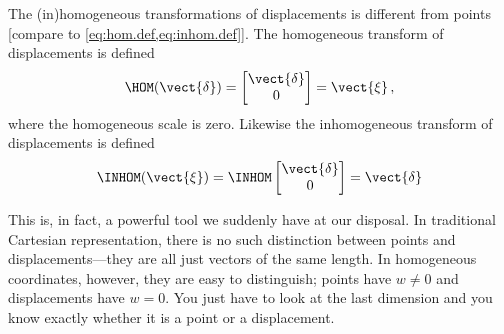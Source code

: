 \documentclass[oneandhalfcolumn]{coursenotes-handout}
\begin{document}
The (in)homogeneous transformations of displacements is different from points [compare to \cref{eq:hom.def,eq:inhom.def}]. The homogeneous transform of displacements is defined
\begin{align}
    \HOM(\vect{\delta}) = \begin{bmatrix} \vect{\delta} \\ 0 \end{bmatrix} = \vect{\xi} \,,
\end{align}
where the homogeneous scale is zero. Likewise the inhomogeneous transform of displacements is defined
\begin{align}
    \INHOM (\vect{\xi}) = \INHOM \begin{bmatrix} \vect{\delta} \\ 0 \end{bmatrix} = \vect{\delta}
\end{align}

This is, in fact, a powerful tool we suddenly have at our disposal. In traditional Cartesian representation, there is no such distinction between points and displacements---they are all just vectors of the same length. In homogeneous coordinates, however, they are easy to distinguish; points have \(w \neq 0\) and displacements have \(w = 0\). You just have to look at the last dimension and you know exactly whether it is a point or a displacement.
\end{document}
